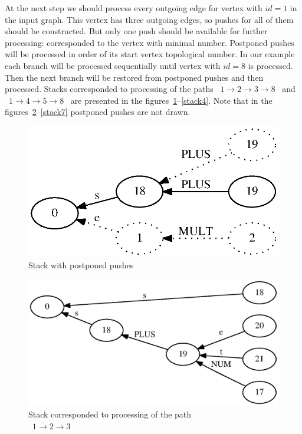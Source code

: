 \documentclass{sigplanconf}
\begin{document}
At the next step we should process every outgoing edge for vertex with $id=1$ in the input graph. This vertex has three outgoing edges, so pushes for all of them should be constructed. But only one push should be available for further processing: corresponded to the vertex with minimal number. Postponed pushes will be processed in order of its start vertex topological number. In our example each branch will be processed sequentially until vertex with $id=8$ is processed. Then the next branch will be restored from postponed pushes and then processed. Stacks corresponded to processing of the paths \ $1 \to 2 \to 3 \to 8$ \ and \ $ 1 \to 4 \to 5 \to 8$ \  are presented in the figures~\ref{stack2}--\ref{stack4}. Note that in the figures~\ref{stack3}--\ref{stack7} postponed pushes are not drawn.

\begin{figure}[h!]
    \begin{center}
        \includegraphics[scale=0.45]{Graphs/stack_1_3_m.eps}
    \end{center}
    \caption{Stack with postponed pushes}
    \label{stack2}
\end{figure}

\begin{figure}[h!]
    \begin{center}
        \includegraphics[scale=0.4]{Graphs/stack_1_4.eps}
    \end{center}
    \caption{Stack corresponded to processing of the path \\ \ $1 \to 2 \to 3$}
    \label{stack3}
\end{figure}
\end{document}
